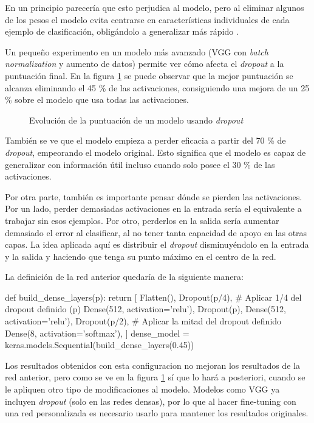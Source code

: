 En un principio parecería que esto perjudica al modelo, pero al eliminar algunos de los pesos el modelo evita centrarse en características individuales de cada ejemplo de clasificación, obligándolo a generalizar más rápido \parencite{dropout}.

Un pequeño experimento en un modelo más avanzado (VGG con \textit{batch normalization} y aumento de datos) permite ver cómo afecta el \textit{dropout} a la puntuación final. En la figura \ref{dropout} se puede observar que la mejor puntuación se alcanza eliminando el 45 \% de las activaciones, consiguiendo una mejora de un 25 \% sobre el modelo que usa todas las activaciones.

\begin{figure}
    \caption{Evolución de la puntuación de un modelo usando \textit{dropout}}
\label{dropout}
\end{figure}


También se ve que el modelo empieza a perder eficacia a partir del 70 \% de \textit{dropout}, empeorando el modelo original. Esto significa que el modelo es capaz de generalizar con información útil incluso cuando solo posee el 30 \% de las activaciones.

Por otra parte, también es importante pensar dónde se pierden las activaciones. Por un lado, perder demasiadas activaciones en la entrada sería el equivalente a trabajar sin esos ejemplos. Por otro, perderlos en la salida sería aumentar demasiado el error al clasificar, al no tener tanta capacidad de apoyo en las otras capas.  La idea aplicada aquí es distribuir el \textit{dropout} disminuyéndolo en la entrada y la salida y haciendo que tenga su punto máximo en el centro de la red.

La definición de la red anterior quedaría de la siguiente manera:

\begin{python}
def build_dense_layers(p):
    return [
        Flatten(),
        Dropout(p/4),  # Aplicar 1/4 del dropout definido (p)
        Dense(512, activation='relu'),
        Dropout(p),
        Dense(512, activation='relu'),
        Dropout(p/2),  # Aplicar la mitad del dropout definido
        Dense(8, activation='softmax'),
    ]
dense_model = keras.models.Sequential(build_dense_layers(0.45))
\end{python}

Los resultados obtenidos con esta configuracion no mejoran los resultados de la red anterior, pero como se ve en la figura \ref{dropout} sí que lo hará a posteriori, cuando se le apliquen otro tipo de modificaciones al modelo. Modelos como VGG ya incluyen \textit{dropout} (solo en las redes densas), por lo que al hacer fine-tuning con una red personalizada es necesario usarlo para mantener los resultados originales.

